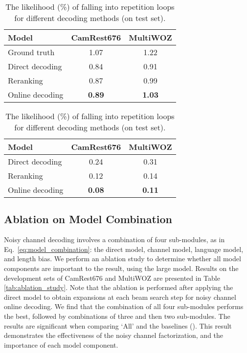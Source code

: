 \documentclass[11pt,a4paper]{article}
\begin{document}
\begin{table}[t]
    \centering
    \footnotesize
    \renewcommand{\arraystretch}{0.9}
    \begin{tabular}{lcc}
        \toprule
        \textbf{Model}  & \textbf{CamRest676} & \textbf{MultiWOZ} \\ \midrule
        Ground truth & 1.07 & 1.22 \\
        Direct decoding & 0.84 & 0.91\\
        Reranking & 0.87 & 0.99\\
        Online decoding & \textbf{0.89} & \textbf{1.03}\\
    \bottomrule
    \end{tabular}
    \vspace{-0.5em}
    \caption{The Zipf scores of responses with different decoding methods (on test set). The value closest to the ground truth is bold. \label{tab:zipf_score}}
    
    \vspace{0.5em}
    \centering
    \footnotesize
    \renewcommand{\arraystretch}{0.9}
    \begin{tabular}{lcc}
        \toprule
        \textbf{Model}  & \textbf{CamRest676} & \textbf{MultiWOZ} \\ \midrule
        Direct decoding & 0.24 & 0.31\\
        Reranking & 0.12 & 0.14\\
        Online decoding & \textbf{0.08} & \textbf{0.11}\\
    \bottomrule
    \end{tabular}
    \vspace{-0.5em}
    \caption{The likelihood (\%) of falling into repetition loops for different decoding methods (on test set). \label{tab:repetition_loop}}
    \vspace{-1em}
\end{table}




\subsection{Ablation on Model Combination \label{sec:model_ablation}}

Noisy channel decoding involves a combination of four sub-modules, as in Eq.\ \ref{eq:model_combination}: the direct model, channel model, language model, and length bias. We perform an ablation study to determine whether all model components are important to the result, using the large model. Results on the development sets of CamRest676 and MultiWOZ are presented in Table \ref{tab:ablation_study}. Note that the ablation is performed after applying the direct model to obtain  expansions at each beam search step for noisy channel online decoding. We find that the combination of all four sub-modules performs the best, followed by combinations of three and then two sub-modules. The results are significant when comparing `All' and the baselines (). This result demonstrates the effectiveness of the noisy channel factorization, and the importance of each model component.
\end{document}
